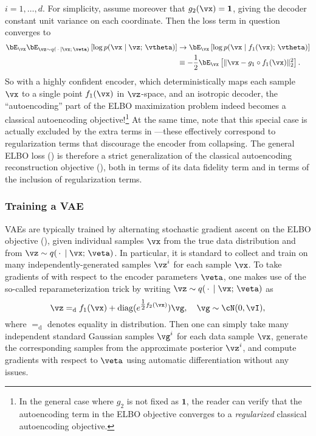 \documentclass[\toplevelprefix/book-main.tex]{subfiles}
\begin{document}
$i = 1, \dots, d$.
For simplicity, assume moreover that $g_2(\vx) = \mathbf{1}$, giving the decoder
constant unit variance on each coordinate.
Then the loss term in question converges to
\begin{align*}
\bE_{\vx}
\bE_{\vz \sim q(\,\cdot\, \mid \vx ;\, \veta)} \left[
  \log p(\vx \mid \vz;\, \vtheta)
\right]
&\to
\bE_{\vx} \left[
  \log p(\vx \mid f_1(\vx);\, \vtheta)
\right]
\\
&\equiv
-\frac{1}{2} \bE_{\vx} \left[
  \|\vx - g_1\circ f_1(\vx)\|_2^2
\right].
\end{align*}
So with a highly confident encoder, which deterministically maps each sample
$\vx$ to a single point $f_1(\vx)$ in $\vz$-space, and an isotropic decoder,
the ``autoencoding'' part of the ELBO maximization problem indeed becomes
a classical autoencoding objective!\footnote{In the general case where $g_2$ is
not fixed as $\mathbf{1}$, the reader can verify that the autoencoding term in
the ELBO objective converges to a \textit{regularized} classical autoencoding
objective.}
At the same time, note that this special case is actually excluded by the
extra terms in ---these effectively correspond to
regularization terms that discourage the encoder from collapsing.
The general ELBO loss () is
therefore a strict generalization of the classical autoencoding reconstruction
objective (), both in terms of its data fidelity term
and in terms of the inclusion of regularization terms.

\subsubsection{Training a VAE}
VAEs are typically trained by alternating stochastic gradient ascent on the ELBO
objective (), given individual samples
$\vx$ from the
true data distribution and from $\vz \sim q(\,\cdot\,\mid \vx;\, \veta)$. In
particular, it is standard to collect and train on many independently-generated
samples $\vz^{i}$ for each sample $\vx$. To take gradients of
 with respect to the encoder parameters $\veta$,
one makes use of the so-called reparameterization trick by writing $\vz \sim
q(\,\cdot\,\mid \vx;\, \veta)$ as
\begin{equation*}
\vz =_{\mathrm{d}} f_1(\vx) + \diag(e^{\tfrac{1}{2}f_2(\vx)}) \vg,
\quad \vg \sim
\cN(0, \vI),
\end{equation*}
where $=_{\mathrm{d}}$ denotes equality in distribution. Then one can simply
take many independent standard Gaussian samples $\vg^{i}$ for each data sample
$\vx$, generate the corresponding samples from the approximate posterior
$\vz^i$, and compute gradients with respect to $\veta$ using automatic
differentiation without any issues.
\end{document}
